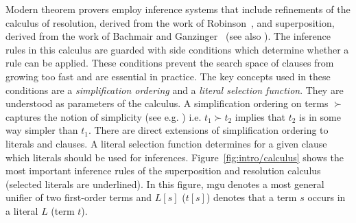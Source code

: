Modern theorem provers employ inference systems that include refinements of the calculus of resolution, derived from the work of Robinson~\cite{Robinson65}, and superposition, derived from the work of Bachmair and Ganzinger~\cite{BG94} (see also \cite{Ganzinger01,NieuwenhuisRubio:HandbookAR:paramodulation:2001}). The inference rules in this calculus are guarded with side conditions which determine whether a rule can be applied. These conditions prevent the search space of clauses from growing too fast and are essential in practice. The key concepts used in these conditions are a \emph{simplification ordering} and a \emph{literal selection function}. They are understood as parameters of the calculus. A simplification ordering on terms $\succ$ captures the notion of simplicity (see e.g. \cite{DBLP:books/el/RV01/DershowitzP01}) i.e. $t_1 \succ t_2$ implies that $t_2$ is in some way simpler than $t_1$. There are direct extensions of simplification ordering to literals and clauses. A literal selection function determines for a given clause which literals should be used for inferences. Figure~\ref{fig:intro/calculus} shows the most important inference rules of the superposition and resolution calculus (selected literals are underlined). In this figure, $\mathrm{mgu}$ denotes a most general unifier of two first-order terms and $L[s]$ ($t[s]$) denotes that a term $s$ occurs in a literal $L$ (term $t$).







